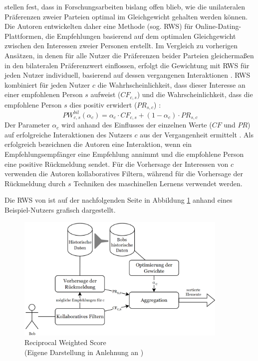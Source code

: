 \textcite[S. 131ff.]{kleinerman:2:inproceedings} stellen fest, dass in Forschungsarbeiten bislang offen blieb, wie die unilateralen Präferenzen zweier Parteien optimal im Gleichgewicht gehalten werden können.
Die Autoren entwickelten daher eine Methode (sog. \ac{RWS}) für Online-Dating-Plattformen, die Empfehlungen basierend auf dem optimalen Gleichgewicht zwischen den Interessen zweier Personen erstellt.
Im Vergleich zu vorherigen Ansätzen, in denen für alle Nutzer die Präferenzen beider Parteien gleichermaßen in den bilateralen Präferenzwert einflossen, erfolgt die Gewichtung mit \ac{RWS} für jeden Nutzer individuell, basierend auf dessen vergangenen Interaktionen \cite[S. 133]{kleinerman:2:inproceedings}.
\ac{RWS} kombiniert für jeden Nutzer $c$ die Wahrhscheinlichkeit, dass dieser Interesse an einer empfohlenen Person $s$ aufweist ($CF_{c,s}$) und die Wahrscheinlichkeit, dass die empfohlene Person $s$ dies positiv erwidert ($PR_{s,c}$) \cite[S. 131f.]{kleinerman:2:inproceedings}:
\begin{equation}\label{eq36}
    PW_{c,s}^{bil}(\alpha_{c}) = \alpha_{c} \cdot CF_{c,s} + (1-\alpha_{c}) \cdot PR_{s,c}
\end{equation}
Der Parameter $\alpha_{c}$ wird anhand des Einflusses der einzelnen Werte ($CF$ und $PR$) auf erfolgreiche Interaktionen des Nutzers $c$ aus der Vergangenheit ermittelt \cite[S. 135]{kleinerman:2:inproceedings}.
Als erfolgreich bezeichnen die Autoren eine Interaktion, wenn ein Empfehlungsempfänger eine Empfehlung annimmt und die empfohlene Person eine positive Rückmeldung sendet.
Für die Vorhersage der Interessen von $c$ verwenden die Autoren kollaboratives Filtern, während für die Vorhersage der Rückmeldung durch $s$ Techniken des maschinellen Lernens verwendet werden.

Die \ac{RWS} von \textcite[S. 134]{kleinerman:2:inproceedings} ist auf der nachfolgenden Seite in Abbildung \ref{fig:relatedwork:abb2} anhand eines Beispiel-Nutzers grafisch dargestellt.

\begin{figure}
    \centering
	\includegraphics[width=0.9\textwidth]{gfx/rws.png}
	\caption[Reciprocal Weighted Score]{Reciprocal Weighted Score\\
    (Eigene Darstellung in Anlehnung an \cite[S. 134]{kleinerman:2:inproceedings})}
	\label{fig:relatedwork:abb2}
\end{figure}

